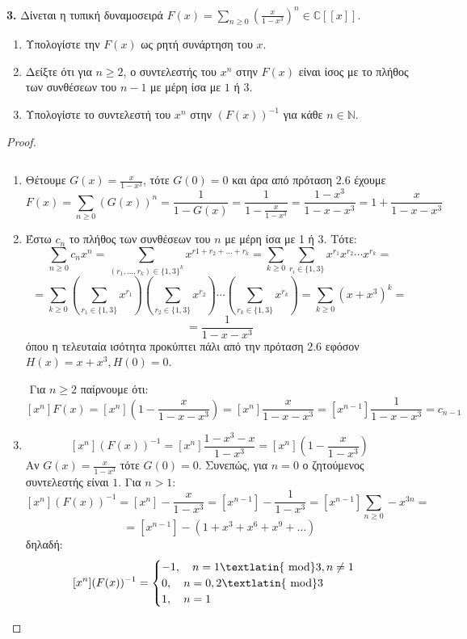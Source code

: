\documentclass[oneside,a4paper]{article}
\newcommand {\tl}{\textlatin}
\begin{document}
\textbf{3. } Δίνεται η τυπική δυναμοσειρά $F(x) = \sum\limits_{n\geq 0} \left(\frac{x}{1-x^3}\right)^n \in \mathbb{C}[[x]]$.
\begin{enumerate}
	\item Υπολογίστε την $F(x)$ ως ρητή συνάρτηση του $x$.
	\item Δείξτε ότι για $n\geq 2$, ο συντελεστής του $x^n$ στην $F(x)$ είναι ίσος με το πλήθος των συνθέσεων του $n-1$ με μέρη ίσα με $1$ ή $3$.
	\item Υπολογίστε το συντελεστή του $x^n$ στην $(F(x))^{-1}$ για κάθε $n \in \mathbb{N}$.
\end{enumerate}
\begin{proof}$ $

	$ $\newline
	\begin{enumerate}
		\item Θέτουμε $G(x) = \frac{x}{1-x^3}$, τότε $G(0) = 0$ και άρα από πρόταση $2.6$ έχουμε
		$$F(x) = \sum\limits_{n\geq 0} (G(x))^n = \frac1{1-G(x)} = \frac1{1-\frac{x}{1-x^3}} = \frac{1-x^3}{1-x-x^3} = 1 + \frac{x}{1-x-x^3}$$

		\item Έστω $c_n$ το πλήθος των συνθέσεων του $n$ με μέρη ίσα με 1 ή 3. Τότε:
		$$\sum\limits_{n\geq 0 } c_n x^n = \sum\limits_{(r_1,\ldots,r_k) \in \{1,3\}^k} x^{r1+r_2 + \ldots + r_k} = \sum\limits_{k \geq 0} \sum\limits_{r_i \in \{1,3\}} x^{r_1} x^{r_2} \cdots x^{r_k} = $$
		$$ = \sum\limits_{k\geq 0 } \left(\sum\limits_{r_1 \in \{1,3\}} x^{r_1}\right) \left(\sum\limits_{r_2 \in \{1,3\}} x^{r_2}\right) \cdots \left(\sum\limits_{r_k \in \{1,3\}} x^{r_k}\right) = \sum\limits_{k\geq 0} (x+x^3)^k = $$
		$$= \frac1{1-x-x^3}$$
		όπου η τελευταία ισότητα προκύπτει πάλι από την πρόταση $2.6$ εφόσον $H(x) = x+x^3, H(0)=0$.
		
		$ $\newline
		Για $n\geq 2$ παίρνουμε ότι:
		$$[x^n] F(x) = [x^n] \left( 1 - \frac{x}{1-x-x^3} \right) = [x^n] \frac{x}{1-x-x^3} = [x^{n-1}] \frac1{1-x-x^3} = c_{n-1}$$

		\item 
		$$[x^n] (F(x))^{-1} = [x^n] \frac{1-x^3 - x}{1-x^3} = [x^n] \left(1 - \frac{x}{1-x^3}\right)$$
		Αν $G(x) = \frac{x}{1-x^3}$ τότε $G(0)=0$. Συνεπώς, για $n=0$ ο ζητούμενος συντελεστής είναι $1$. Για $n>1$:
		$$[x^n] (F(x))^{-1} = [x^n] - \frac{x}{1-x^3} = [x^{n-1}] - \frac1{1-x^3} = [x^{n-1}] \sum\limits_{n\geq 0 } - x^{3n} = $$
		$$= [x^{n-1}] -\left( 1 + x^3 + x^6 + x^9 + \ldots \right)$$
		δηλαδή:  
		$$[x^n] (F(x))^{-1} = 
		\begin{cases}
			-1, \quad n = 1 \text{\tl{ mod}}3, n\neq 1 \\
			0, \quad n = 0,2 \text{\tl{ mod}}3 \\
			1, \quad n=1
		\end{cases}$$
		
	\end{enumerate}
\end{proof}
\pagebreak
\end{document}
